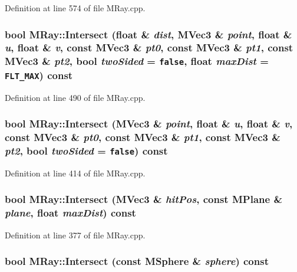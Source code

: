Definition at line 574 of file MRay.cpp.\hypertarget{class_m_ray_5c809d98738674e546cc254e931ebe36}{
\subsubsection[{Intersect}]{\setlength{\rightskip}{0pt plus 5cm}bool MRay::Intersect (float \& {\em dist}, \/  {\bf MVec3} \& {\em point}, \/  float \& {\em u}, \/  float \& {\em v}, \/  const {\bf MVec3} \& {\em pt0}, \/  const {\bf MVec3} \& {\em pt1}, \/  const {\bf MVec3} \& {\em pt2}, \/  bool {\em twoSided} = {\tt false}, \/  float {\em maxDist} = {\tt FLT\_\-MAX}) const}}
\label{class_m_ray_5c809d98738674e546cc254e931ebe36}




Definition at line 490 of file MRay.cpp.\hypertarget{class_m_ray_ad9ff091b32845ef02aab6baa1bed1b1}{
\subsubsection[{Intersect}]{\setlength{\rightskip}{0pt plus 5cm}bool MRay::Intersect ({\bf MVec3} \& {\em point}, \/  float \& {\em u}, \/  float \& {\em v}, \/  const {\bf MVec3} \& {\em pt0}, \/  const {\bf MVec3} \& {\em pt1}, \/  const {\bf MVec3} \& {\em pt2}, \/  bool {\em twoSided} = {\tt false}) const}}
\label{class_m_ray_ad9ff091b32845ef02aab6baa1bed1b1}




Definition at line 414 of file MRay.cpp.\hypertarget{class_m_ray_e8b4fd4410de61bd1e3d8db92e0bcbb7}{
\subsubsection[{Intersect}]{\setlength{\rightskip}{0pt plus 5cm}bool MRay::Intersect ({\bf MVec3} \& {\em hitPos}, \/  const {\bf MPlane} \& {\em plane}, \/  float {\em maxDist}) const}}
\label{class_m_ray_e8b4fd4410de61bd1e3d8db92e0bcbb7}




Definition at line 377 of file MRay.cpp.\hypertarget{class_m_ray_ec4c564ad95eae52d3113431b89e1196}{
\subsubsection[{Intersect}]{\setlength{\rightskip}{0pt plus 5cm}bool MRay::Intersect (const {\bf MSphere} \& {\em sphere}) const}}
\label{class_m_ray_ec4c564ad95eae52d3113431b89e1196}




